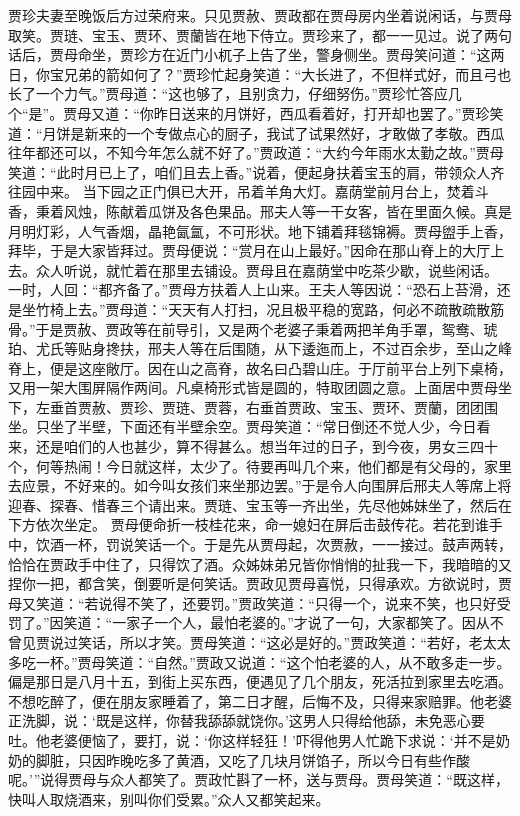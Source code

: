 \documentclass[12pt,oneside]{book}
\begin{document}
贾珍夫妻至晚饭后方过荣府来。只见贾赦、贾政都在贾母房内坐着说闲话，与贾母取笑。贾琏、宝玉、贾环、贾蘭皆在地下侍立。贾珍来了，都一一见过。说了两句话后，贾母命坐，贾珍方在近门小杌子上告了坐，警身侧坐。贾母笑问道：“这两日，你宝兄弟的箭如何了？”贾珍忙起身笑道：“大长进了，不但样式好，而且弓也长了一个力气。”贾母道：“这也够了，且别贪力，仔细努伤。”贾珍忙答应几个“是”。贾母又道：“你昨日送来的月饼好，西瓜看着好，打开却也罢了。”贾珍笑道：“月饼是新来的一个专做点心的厨子，我试了试果然好，才敢做了孝敬。西瓜往年都还可以，不知今年怎么就不好了。”贾政道：“大约今年雨水太勤之故。”贾母笑道：“此时月已上了，咱们且去上香。”说着，便起身扶着宝玉的肩，带领众人齐往园中来。
当下园之正门俱已大开，吊着羊角大灯。嘉荫堂前月台上，焚着斗香，秉着风烛，陈献着瓜饼及各色果品。邢夫人等一干女客，皆在里面久候。真是月明灯彩，人气香烟，晶艳氤氲，不可形状。地下铺着拜毯锦褥。贾母盥手上香，拜毕，于是大家皆拜过。贾母便说：“赏月在山上最好。”因命在那山脊上的大厅上去。众人听说，就忙着在那里去铺设。贾母且在嘉荫堂中吃茶少歇，说些闲话。
一时，人回：“都齐备了。”贾母方扶着人上山来。王夫人等因说：“恐石上苔滑，还是坐竹椅上去。”贾母道：“天天有人打扫，况且极平稳的宽路，何必不疏散疏散筋骨。”于是贾赦、贾政等在前导引，又是两个老婆子秉着两把羊角手罩，鸳鸯、琥珀、尤氏等贴身搀扶，邢夫人等在后围随，从下逶迤而上，不过百余步，至山之峰脊上，便是这座敞厅。因在山之高脊，故名曰凸碧山庄。于厅前平台上列下桌椅，又用一架大围屏隔作两间。凡桌椅形式皆是圆的，特取团圆之意。上面居中贾母坐下，左垂首贾赦、贾珍、贾琏、贾蓉，右垂首贾政、宝玉、贾环、贾蘭，团团围坐。只坐了半壁，下面还有半壁余空。贾母笑道：“常日倒还不觉人少，今日看来，还是咱们的人也甚少，算不得甚么。想当年过的日子，到今夜，男女三四十个，何等热闹！今日就这样，太少了。待要再叫几个来，他们都是有父母的，家里去应景，不好来的。如今叫女孩们来坐那边罢。”于是令人向围屏后邢夫人等席上将迎春、探春、惜春三个请出来。贾琏、宝玉等一齐出坐，先尽他姊妹坐了，然后在下方依次坐定。
贾母便命折一枝桂花来，命一媳妇在屏后击鼓传花。若花到谁手中，饮酒一杯，罚说笑话一个。于是先从贾母起，次贾赦，一一接过。鼓声两转，恰恰在贾政手中住了，只得饮了酒。众姊妹弟兄皆你悄悄的扯我一下，我暗暗的又捏你一把，都含笑，倒要听是何笑话。贾政见贾母喜悦，只得承欢。方欲说时，贾母又笑道：“若说得不笑了，还要罚。”贾政笑道：“只得一个，说来不笑，也只好受罚了。”因笑道：“一家子一个人，最怕老婆的。”才说了一句，大家都笑了。因从不曾见贾说过笑话，所以才笑。贾母笑道：“这必是好的。”贾政笑道：“若好，老太太多吃一杯。”贾母笑道：“自然。”贾政又说道：“这个怕老婆的人，从不敢多走一步。偏是那日是八月十五，到街上买东西，便遇见了几个朋友，死活拉到家里去吃酒。不想吃醉了，便在朋友家睡着了，第二日才醒，后悔不及，只得来家赔罪。他老婆正洗脚，说：‘既是这样，你替我舔舔就饶你。’这男人只得给他舔，未免恶心要吐。他老婆便恼了，要打，说：‘你这样轻狂！’吓得他男人忙跪下求说：‘并不是奶奶的脚脏，只因昨晚吃多了黄酒，又吃了几块月饼馅子，所以今日有些作酸呢。’”说得贾母与众人都笑了。贾政忙斟了一杯，送与贾母。贾母笑道：“既这样，快叫人取烧酒来，别叫你们受累。”众人又都笑起来。
\end{document}
